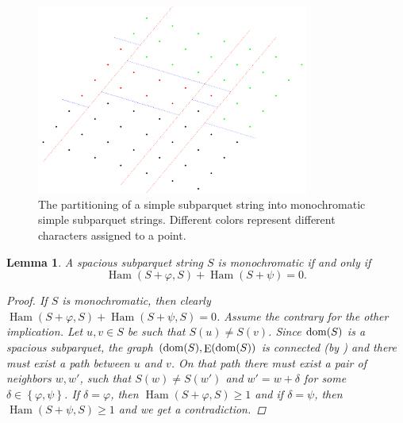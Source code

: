 \documentclass[11pt]{article}
\renewcommand{\phi}{\varphi}
\newcommand{\set}[1]{\left\lbrace #1 \right\rbrace}
\theoremstyle{plain}
\newtheorem{lemma}{Lemma}
\theoremstyle{definition}
\theoremstyle{remark}
\DeclareMathOperator*{\Edges}{E}
\DeclareMathOperator*{\Ham}{Ham}
\begin{document}
\begin{figure}[!t]
	\begin{center}
		\includegraphics[width=0.8\textwidth]{drawings/parquet_decomposition}
	\end{center}
	\caption{The partitioning of a simple subparquet string into monochromatic simple subparquet strings. Different colors represent different characters assigned to a point.}
	\label{figure:parquet_decomposition}
\end{figure}


\begin{lemma}\label{monochromacy_condition}
	A spacious subparquet string $S$ is monochromatic if and only if
	\[\Ham(S + \phi, S) + \Ham(S + \psi) = 0.\]
	\begin{proof}
		If $S$ is monochromatic, then clearly $\Ham(S + \phi, S) + \Ham(S + \psi, S) = 0$.
		Assume the contrary for the other implication.
		Let $u, v \in S$ be such that $S(u) \neq S(v)$.
		Since $\operatorname*{dom}(S)$ is a spacious subparquet, the graph $(\d{S}, \Edges(\d{S})$ is connected (by ) and there must exist a path between $u$ and $v$.
		On that path there must exist a pair of neighbors $w, w'$, such that $S(w) \neq S(w')$ and $w' = w + \delta$ for some $\delta \in \set{\phi, \psi}$.
		If $\delta = \phi$, then $\Ham(S + \phi, S) \ge 1$ and if $\delta = \psi$, then $\Ham(S + \psi, S) \ge 1$ and we get a contradiction.
	\end{proof}
\end{lemma}
\end{document}
